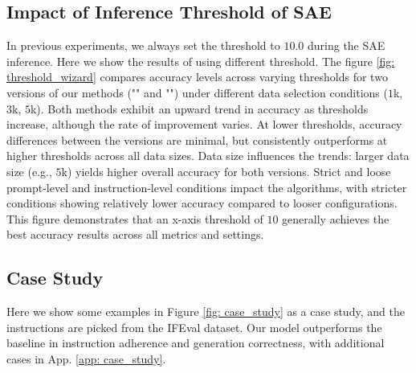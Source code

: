 \subsection{Impact of Inference Threshold of SAE}\label{sec: threshold}
In previous experiments, we always set the threshold to $10.0$ during the SAE inference. Here we show the results of using different threshold.
The figure \ref{fig: threshold_wizard} compares accuracy levels across varying thresholds for two versions of our methods ("\one" and "\two") under different data selection conditions ($1$k, $3$k, $5$k). Both methods exhibit an upward trend in accuracy as thresholds increase, although the rate of improvement varies. At lower thresholds, accuracy differences between the versions are minimal, but \two consistently outperforms \one at higher thresholds across all data sizes. Data size influences the trends: larger data size (e.g., $5$k) yields higher overall accuracy for both versions. Strict and loose prompt-level and instruction-level conditions impact the algorithms, with stricter conditions showing relatively lower accuracy compared to looser configurations. This figure demonstrates that an x-axis threshold of $10$ generally achieves the best accuracy results across all metrics and settings.

\subsection{Case Study}
Here we show some examples in Figure \ref{fig: case_study} as a case study, and the instructions are picked from the IFEval dataset. Our model outperforms the baseline in instruction adherence and generation correctness, with additional cases in App. \ref{app: case_study}.